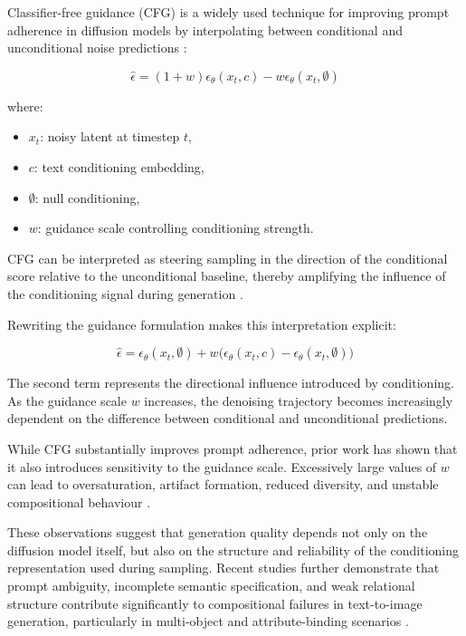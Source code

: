 \documentclass[a4paper,twoside,12pt]{report}
\begin{document}
Classifier-free guidance (CFG) is a widely used technique for improving prompt adherence in diffusion models by interpolating between conditional and unconditional noise predictions \citep{ho2022cfg, nichol2021improved}:

\begin{equation}
\hat{\epsilon}
=
(1 + w)\epsilon_\theta(x_t, c)
-
w\epsilon_\theta(x_t, \emptyset)
\end{equation}

where:
\begin{itemize}
    \item \(x_t\): noisy latent at timestep \(t\),
    \item \(c\): text conditioning embedding,
    \item \(\emptyset\): null conditioning,
    \item \(w\): guidance scale controlling conditioning strength.
\end{itemize}

CFG can be interpreted as steering sampling in the direction of the conditional score relative to the unconditional baseline, thereby amplifying the influence of the conditioning signal during generation \citep{ho2022cfg, song2021scorebasedgenerative, nichol2021improved}.

Rewriting the guidance formulation makes this interpretation explicit:

\begin{equation}
\hat{\epsilon}
=
\epsilon_\theta(x_t,\emptyset)
+
w\big(
\epsilon_\theta(x_t,c)
-
\epsilon_\theta(x_t,\emptyset)
\big)
\label{eq:cfg_decomposition}
\end{equation}

The second term represents the directional influence introduced by conditioning. As the guidance scale \(w\) increases, the denoising trajectory becomes increasingly dependent on the difference between conditional and unconditional predictions.

While CFG substantially improves prompt adherence, prior work has shown that it also introduces sensitivity to the guidance scale. Excessively large values of \(w\) can lead to oversaturation, artifact formation, reduced diversity, and unstable compositional behaviour \citep{ho2022cfg, saharia2022imagen, rombach2022ldm}.

These observations suggest that generation quality depends not only on the diffusion model itself, but also on the structure and reliability of the conditioning representation used during sampling. Recent studies further demonstrate that prompt ambiguity, incomplete semantic specification, and weak relational structure contribute significantly to compositional failures in text-to-image generation, particularly in multi-object and attribute-binding scenarios \citep{liu2022composable, huang2023t2icompbench, mehrabi2023ambiguities, elsharif2025ambiguity}.
\end{document}
